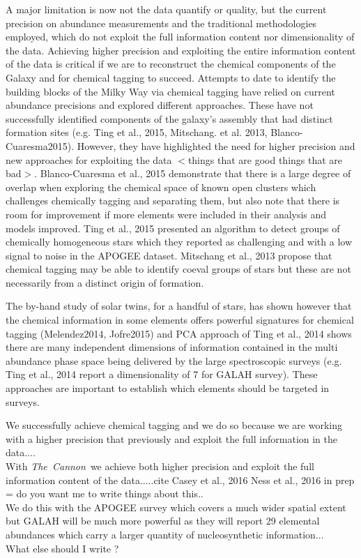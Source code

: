 \documentclass[12pt, preprint]{aastex}
\newcommand{\project}[1]{\textsl{#1}}
\newcommand{\tc}{\project{The~Cannon}}
\begin{document}
A major limitation is now not the data quantify or quality, but the current precision on abundance measurements \citep[e.g.][]{Ting2015, Martel2015} and the traditional methodologies employed, which do not exploit the full information content nor dimensionality of the data. Achieving higher precision and exploiting the entire information content of the data is critical if we are to reconstruct the chemical components of the Galaxy and for chemical tagging to succeed. Attempts to date to identify the building blocks of the Milky Way via chemical tagging have relied on current abundance precisions and explored different approaches. These have not successfully identified components of the galaxy's assembly that had distinct formation sites (e.g. Ting et al., 2015, Mitschang. et al. 2013, Blanco-Cuaresma2015). However, they have highlighted  the need for higher precision and new approaches for exploiting the data $<$things that are good things that are bad$>$.  Blanco-Cuaresma et al., 2015 demonstrate that there is a large degree of overlap when exploring the chemical space of known open clusters which challenges chemically tagging and separating them, but also note that there is room for improvement if more elements were included in their analysis and models improved. Ting et al., 2015 presented an algorithm to detect groups of chemically homogeneous stars which they reported as challenging and with a low signal to noise in the APOGEE dataset. Mitschang et al., 2013 propose that  chemical tagging may be able to identify coeval groups of stars but these are not necessarily from a distinct origin of formation.

The by-hand study of solar twins, for a handful of stars, has shown however that the chemical information in some elements offers powerful signatures for chemical tagging (Melendez2014, Jofre2015) and PCA approach of Ting et al., 2014 shows there are many independent dimensions of information contained in the multi abundance phase space being delivered by the large spectroscopic surveys (e.g. Ting et al., 2014 report a dimensionality of 7 for GALAH survey). These approaches are important to establish which elements should be targeted in surveys.

We successfully achieve chemical tagging and we do so because we are working with a higher precision that previously and exploit the full information in the data....\\

With \tc\ we achieve both higher precision and exploit the full information content of the data.....cite Casey et al., 2016 Ness et al., 2016 in prep = do you want me to write things about this..\\

We do this with the APOGEE survey which covers a much wider spatial extent but GALAH will be much more powerful as they will report 29 elemental abundances which carry a larger quantity of nucleosynthetic information... \\

What else should I write ? \\
\end{document}
